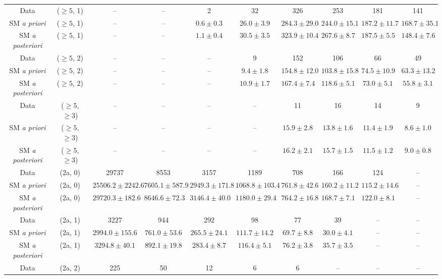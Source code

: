 \begin{table}[h!]
{\begin{tabular}{cccccccccc}
	Data & ($\ge5$, 1) & -- & -- & 2 & 32 & 326 & 253 & 181 & 141 \\[0.5ex] 
	SM \textit{a priori} & ($\ge5$, 1) & -- & -- & $0.6\pm 0.3$ & $26.0\pm 3.9$ & $284.3\pm 29.0$ & $244.0\pm 15.1$ & $187.2\pm 11.7$ & $168.7\pm 35.1$ \\[0.5ex] 
	SM \textit{a posteriori} & ($\ge5$, 1) & -- & -- & $1.1\pm 0.4$ & $30.5\pm 3.5$ & $323.9\pm 10.4$ & $267.6\pm 8.7$ & $187.5\pm 5.5$ & $148.4\pm 7.6$ \\[0.5ex] 
	Data & ($\ge5$, 2) & -- & -- & -- & 9 & 152 & 106 & 66 & 49 \\[0.5ex] 
	SM \textit{a priori} & ($\ge5$, 2) & -- & -- & -- & $9.4\pm 1.8$ & $154.8\pm 12.0$ & $103.8\pm 15.8$ & $74.5\pm 10.9$ & $63.3\pm 13.2$ \\[0.5ex] 
	SM \textit{a posteriori} & ($\ge5$, 2) & -- & -- & -- & $10.9\pm 1.7$ & $167.4\pm 7.4$ & $118.6\pm 5.1$ & $73.0\pm 5.1$ & $55.8\pm 3.1$ \\[0.5ex] 
	Data & ($\ge5$, $\ge3$) & -- & -- & -- & -- & 11 & 16 & 14 & 9 \\[0.5ex] 
	SM \textit{a priori} & ($\ge5$, $\ge3$) & -- & -- & -- & -- & $15.9\pm 2.8$ & $13.8\pm 1.6$ & $11.4\pm 1.9$ & $8.6\pm 1.0$ \\[0.5ex] 
	SM \textit{a posteriori} & ($\ge5$, $\ge3$) & -- & -- & -- & -- & $16.2\pm 2.1$ & $15.7\pm 1.5$ & $11.5\pm 1.2$ & $9.0\pm 0.8$ \\[0.5ex] 
	Data & (2a, 0) & 29737 & 8553 & 3157 & 1189 & 708 & 166 & 124 & -- \\[0.5ex] 
	SM \textit{a priori} & (2a, 0) & $25506.2\pm 2242.6$ & $7605.1\pm 587.9$ & $2949.3\pm 171.8$ & $1068.8\pm 103.4$ & $761.8\pm 42.6$ & $160.2\pm 11.2$ & $115.2\pm 14.6$ & -- \\[0.5ex] 
	SM \textit{a posteriori} & (2a, 0) & $29720.3\pm 182.6$ & $8646.6\pm 72.3$ & $3146.4\pm 40.0$ & $1180.0\pm 29.4$ & $764.2\pm 16.8$ & $168.7\pm 7.1$ & $122.0\pm 8.1$ & -- \\[0.5ex] 
	Data & (2a, 1) & 3227 & 944 & 292 & 98 & 77 & 39 & -- & -- \\[0.5ex] 
	SM \textit{a priori} & (2a, 1) & $2994.0\pm 155.6$ & $761.0\pm 53.6$ & $265.5\pm 24.1$ & $111.7\pm 14.2$ & $69.7\pm 8.8$ & $30.0\pm 4.1$ & -- & -- \\[0.5ex] 
	SM \textit{a posteriori} & (2a, 1) & $3294.8\pm 40.1$ & $892.1\pm 19.8$ & $283.4\pm 8.7$ & $116.4\pm 5.1$ & $76.2\pm 3.8$ & $35.7\pm 3.5$ & -- & -- \\[0.5ex] 
	Data & (2a, 2) & 225 & 50 & 12 & 6 & 6 & -- & -- & -- \\[0.5ex] 

\end{tabular}}
\end{table}
